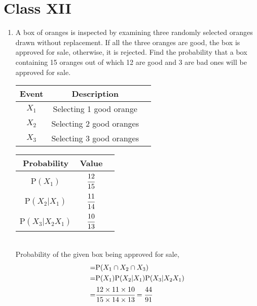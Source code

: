\documentclass[journal,12pt,twocolumn]{IEEEtran}
\renewcommand\thesection{\arabic{section}}
\begin{document}
\section*{Class XII}
\begin{enumerate}[label=13.\arabic{enumi}.\arabic{enumii}]%

\setcounter{enumi}{1}
\setcounter{enumii}{3}
\item A box of oranges is inspected by examining three randomly selected oranges drawn without replacement. If all the three oranges are good, the box is approved for sale, otherwise, it is rejected. Find the probability that a box containing 15 oranges out of which 12 are good and 3 are bad ones will be approved for sale.\\
	\solution
	\begin{table}[h!]
	\small
	\centering
		\begin{tabular}{|c|c|c|} \hline
			\textbf{Event}&\textbf{Description}\\ \hline
			$X_1$&Selecting 1 good orange  \\ \hline 
			$X_2$&Selecting 2 good oranges \\ \hline
			$X_3$&Selecting 3 good oranges \\ \hline
		\end{tabular}
	\end{table}
	\begin{table}[h!]
	\small
	\centering
		\begin{tabular}[20pt]{|c|c|c|} \hline
			\textbf{Probability}&\textbf{Value}\\ \hline
			P$(X_1)$ \T  &$\cfrac{12}{15}$  \\[1.5ex] \hline
			P$(X_2|X_1)$&$\cfrac{11}{14}$  \\[1.5ex] \hline
			P$(X_3|X_2X_1)$&$\cfrac{10}{13}$  \\[1.5ex] \hline
		\end{tabular}
	\end{table}\\
	Probability of the given box being approved for sale,
	\begin{align}
		=& {}\text{P}(X_1\cap X_2\cap X_3) \\
		=& {}\text{P}(X_1)\text{P}(X_2|X_1)\text{P}(X_3|X_2X_1) \\
		=& \cfrac{12 \times 11 \times 10}{15 \times 14 \times 13} = \cfrac{44}{91}

\end{align}
\end{enumerate}
\end{document}
